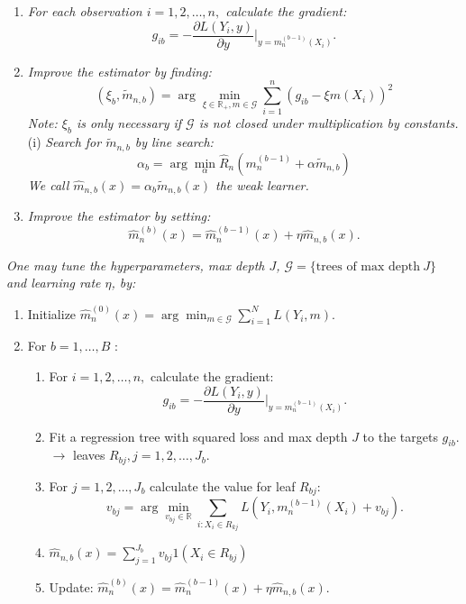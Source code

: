 \documentclass[
]{book}
\providecommand{\tightlist}{%
  \setlength{\itemsep}{0pt}\setlength{\parskip}{0pt}}
\begin{document}
\begin{enumerate}
\def\labelenumi{(\alph{enumi})}
\tightlist
\item
  \emph{For each observation \(i=1,2, \ldots, n,\) calculate the gradient:}
  \[g_{ib}=-\frac{\partial L(Y_i,y)}{\partial y} \Bigr\rvert_{y=m_n^{(b-1)}(X_i)}.\]
\item
  \emph{Improve the estimator by finding:}
  \[(\xi_b, \tilde m_{n,b})= \arg \min_{\xi\in \mathbb R_+,m \in \mathcal G}\sum_{i=1}^n(g_{ib}-\xi m(X_i))^2\]
  \emph{Note: \(\xi_b\) is only necessary if \(\mathcal G\) is not closed under multiplication by constants.}
  (i) \emph{Search for \(\tilde m_{n,b}\) by line search:}
  \[\alpha_b= \arg \min_{\alpha} \hat R_n(m_n^{(b-1)}+\alpha \tilde  m_{n,b})\]
  \emph{We call \(\hat m_{n,b}(x)= \alpha_b \tilde m_{n,b}(x)\) the weak learner.}
\item
  \emph{Improve the estimator by setting:}
  \[\hat m^{(b)}_n(x)=\hat m^{(b-1)}_n(x)+\eta \hat m_{n,b}(x).\]
\end{enumerate}

\emph{One may tune the hyperparameters, max depth \(J\), \(\mathcal G=\{\text{trees of max depth} \ J\}\) and learning rate \(\eta\), by:}

\begin{enumerate}
\def\labelenumi{\arabic{enumi}.}
\tightlist
\item
  Initialize \(\hat m_{n}^{(0)}(x)=\arg \min_{m \in \mathcal G} \sum_{i=1}^N L\left(Y_i, m\right)\).
\item
  For \(b=1,\dots,B\) :

  \begin{enumerate}
  \def\labelenumii{(\alph{enumii})}
  \tightlist
  \item
    For \(i=1,2, \ldots, n,\) calculate the gradient:
    \[
    g_{ib}=-\frac{\partial L(Y_i,y)}{\partial y} \Bigr\rvert_{y=m_n^{(b-1)}(X_i)} .
    \]
  \item
    Fit a regression tree with squared loss and max depth \(J\) to the targets \(g_{ib}\). \(\rightarrow\) leaves \(R_{bj}, j=1,2, \ldots, J_b\).
  \item
    For \(j=1,2, \ldots, J_b\) calculate the value for leaf \(R_{bj}\):
    \[
    v_{bj}=\arg \min_{ v_{bj} \in \mathbb R} \sum_{i: X_i \in R_{kj}} L\left(Y_i, m_n^{(b-1)}(X_i)+ v_{bj}\right) .
    \]
  \item
    \(\hat m_{n,b}(x)=\sum_{j=1}^{J_b} v_{bj} 1\left(X_i \in R_{b j}\right)\)
  \item
    Update: \(\hat m^{(b)}_n(x)=\hat m^{(b-1)}_n(x)+ \eta \hat m_{n,b}(x)\).
  \end{enumerate}
\end{enumerate}
\end{document}
